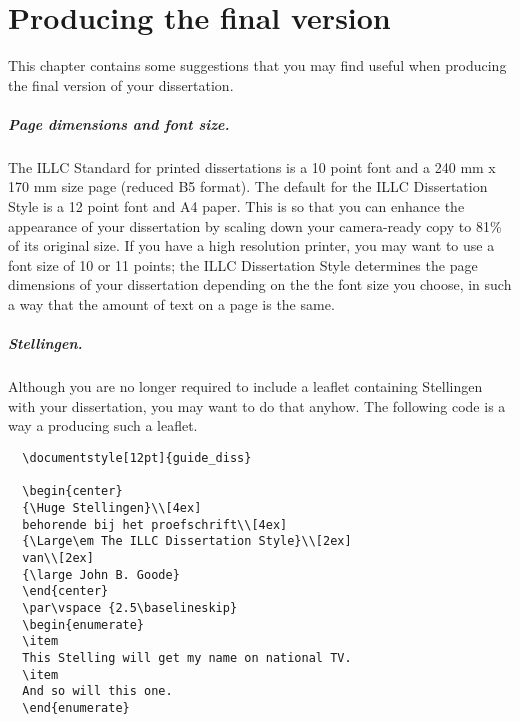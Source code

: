\chapter{Producing the final version}
This chapter contains some suggestions that you may find useful 
when producing the final version of your dissertation.

\paragraph*{Page dimensions and font size.}
The ILLC Standard for printed dissertations is a
10 point font and a 240 mm x 170 mm size page (reduced B5 format).
The default for the ILLC Dissertation Style is a 12 point font and A4 paper.
This is so that you can enhance the appearance of your dissertation
by scaling down your camera-ready copy to 81\% of its original size.
If you have a high resolution printer, you may want to use a font size
of 10 or 11 points; 
the ILLC Dissertation Style determines the page dimensions of your dissertation 
depending on the the font size you choose, in such a way that the amount of
text on a page is the same.

\paragraph*{Stellingen.}
Although you are no longer required to include a leaflet containing
Stellingen with your dissertation, you may want to do that anyhow.
The following code is a way a producing such a leaflet.
\begin{verbatim}
  \documentstyle[12pt]{guide_diss}
  
  \begin{center}
  {\Huge Stellingen}\\[4ex]
  behorende bij het proefschrift\\[4ex]
  {\Large\em The ILLC Dissertation Style}\\[2ex]
  van\\[2ex]
  {\large John B. Goode}
  \end{center}
  \par\vspace {2.5\baselineskip}
  \begin{enumerate}
  \item 
  This Stelling will get my name on national TV.
  \item
  And so will this one.
  \end{enumerate}
\end{verbatim}


